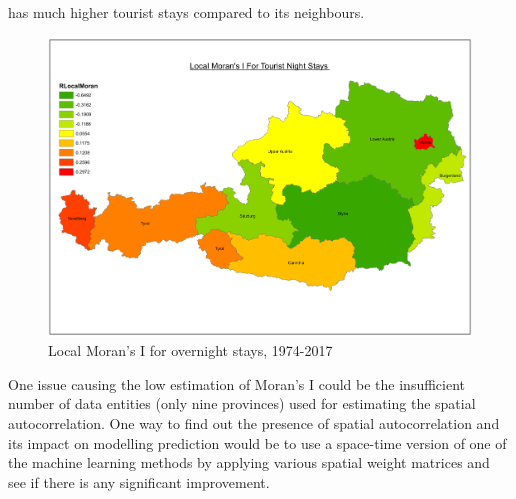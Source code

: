 \documentclass[a4paper,reqno,]{article}
\begin{document}
has much higher tourist stays compared to its neighbours.    
\begin{figure}[H]
\centering
\includegraphics[width=\textwidth]{images/EA/LocalMoranStaysMap.pdf}
\caption{Local Moran's I for overnight stays, 1974-2017}
\label{fig:morans_i}
\end{figure}
\noindent
One issue causing the low estimation of Moran's I could be the insufficient number of data entities (only nine provinces) used for estimating the spatial autocorrelation. One way to find out the presence of spatial autocorrelation and its impact on modelling prediction would be to use a space-time version of one of the machine learning methods by applying various spatial weight matrices and see if there is any significant improvement.  
\clearpage
\end{document}
